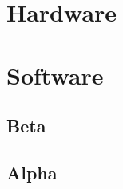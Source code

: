\documentclass[]{politex}
\begin{document}








\part{Hardware}




\part{Software}







\blindtext

\begin{citacaoLonga}
	\blindtext
\end{citacaoLonga}

\blindtext


%




\apendice
\chapter{}
\chapter{Beta}

\anexo
\chapter{Alpha}
\chapter{}
\end{document}
